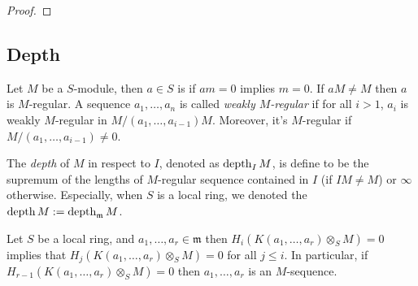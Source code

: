 \begin{theorem}
	\label{thm:koszul_exact_iff_reg_seq}
\end{theorem}

\begin{proof}
\end{proof}

\subsection{Depth}

\begin{definition}
	Let $M$ be a $S$-module, then $a \in S$ is  if $am = 0 $ implies $m = 0$.
	If $aM \neq M$ then $a$ is $M$-regular.
	A sequence $a_1, \dots, a_n$ is called \textit{weakly $M$-regular} if for all $i > 1$, $a_i$ is weakly $M$-regular in $M/(a_1,\dots,a_{i-1})M$.
	Moreover, it's $M$-regular if $M/(a_1, \dots, a_{i-1}) \neq 0$.
\end{definition}

\begin{definition}
	The \textit{depth} of $M$ in respect to $I$, denoted as $\operatorname{depth}_I M$, is define to be the supremum of the lengths of $M$-regular sequence contained in $I$ (if $IM \neq M$) or $\infty$ otherwise.
	Especially, when $S$ is a local ring, we denoted the $\operatorname{depth} M := \operatorname{depth}_\mathfrak{m}M$.
\end{definition}

\begin{theorem}
	\label{thm: depth_equal_van_index_koszul_homology}
	Let $S$ be a local ring, and $a_1, \dots, a_r \in \mathfrak{m}$ then $H_i(K(a_1, \dots, a_r) \otimes_S M) = 0$ implies that $H_j(K(a_1, \dots, a_r) \otimes_S M) = 0$ for all $j \leq i$.
	In particular, if $H_{r-1}(K(a_1, \dots, a_r) \otimes_S M) = 0$ then $a_1, \dots, a_r$ is an $M$-sequence.
\end{theorem}


